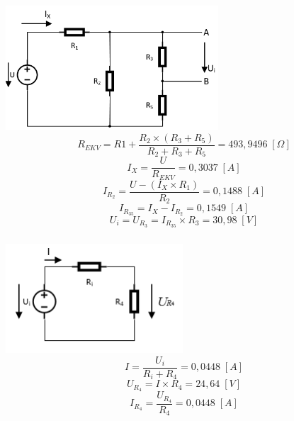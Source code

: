 \documentclass[a4paper,12pt]{article}
\begin{document}
		\subsubsection{} %
			\includegraphics[width=300px]{2_2.png}
			\begin{equation}
				R_{EKV} = R1 + \frac{R_2 \times (R_3 + R_5)}{R_2 + R_3 + R_5} = 493,9496 \;[\Omega] \nonumber
			\end{equation}
			\begin{equation}
				I_X = \frac{U}{R_{EKV}} = 0,3037 \;[A] \nonumber
			\end{equation}
			\begin{equation}
				I_{R_2} = \frac{U - (I_X \times R_1)}{R_2} = 0,1488 \;[A] \nonumber
			\end{equation}
			\begin{equation}
				I_{R_{35}} = I_X - I_{R_2} = 0,1549 \;[A] \nonumber
			\end{equation}
			\begin{equation}
				U_i = U_{R_3} = I_{R_{35}} \times R_3 = 30,98 \;[V] \nonumber
			\end{equation}
		\subsubsection{}
			\includegraphics[width=250px]{2_4.png}
			\begin{equation}
				I = \frac{U_i}{R_i + R_4} = 0,0448 \;[A] \nonumber
			\end{equation}
			\begin{equation}
				U_{R_4} = I \times R_4 = 24,64 \;[V] \nonumber
			\end{equation}
			\begin{equation}
				I_{R_4} = \frac{U_{R_4}}{R_4} = 0,0448 \;[A] \nonumber
			\end{equation}
			\pagebreak
\end{document}
